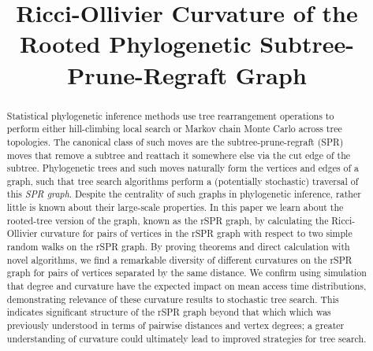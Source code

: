 \documentclass[11pt,onecolumn,conference]{IEEEtran}
\begin{document}
\title{Ricci-Ollivier Curvature of the Rooted Phylogenetic Subtree-Prune-Regraft Graph}

\author{
	\and
}

\maketitle
\IEEEpeerreviewmaketitle

\begin{abstract}
Statistical phylogenetic inference methods use tree rearrangement operations to perform either hill-climbing local search or Markov chain Monte Carlo across tree topologies.
The canonical class of such moves are the subtree-prune-regraft (SPR) moves that remove a subtree and reattach it somewhere else via the cut edge of the subtree.
Phylogenetic trees and such moves naturally form the vertices and edges of a graph, such that tree search algorithms perform a (potentially stochastic) traversal of this \emph{SPR graph}.
Despite the centrality of such graphs in phylogenetic inference, rather little is known about their large-scale properties.
In this paper we learn about the rooted-tree version of the graph, known as the rSPR graph, by calculating the Ricci-Ollivier curvature for pairs of vertices in the rSPR graph with respect to two simple random walks on the rSPR graph.
By proving theorems and direct calculation with novel algorithms, we find a remarkable diversity of different curvatures on the rSPR graph for pairs of vertices separated by the same distance.
We confirm using simulation that degree and curvature have the expected impact on mean access time distributions, demonstrating relevance of these curvature results to stochastic tree search.
This indicates significant structure of the rSPR graph beyond that which which was previously understood in terms of pairwise distances and vertex degrees; a greater understanding of curvature could ultimately lead to improved strategies for tree search.
\end{abstract}
\end{document}
